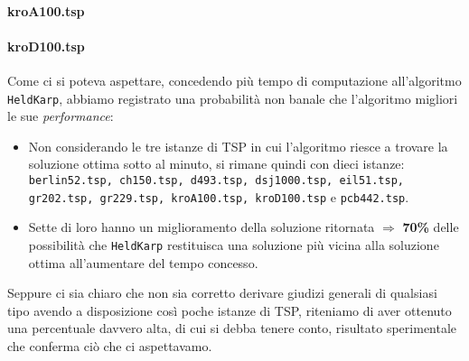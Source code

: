 \paragraph*{kroA100.tsp}
\paragraph*{kroD100.tsp}
\mbox{}\eqcapo

Come ci si poteva aspettare, concedendo più tempo di computazione all'algoritmo \texttt{HeldKarp}, abbiamo registrato una probabilità non banale che l'algoritmo migliori le sue \emph{performance}: 
\begin{itemize}
	\item Non considerando le tre istanze di TSP in cui l'algoritmo riesce a trovare la soluzione ottima sotto al minuto, si rimane quindi con dieci istanze: \texttt{berlin52.tsp, ch150.tsp, d493.tsp, dsj1000.tsp, eil51.tsp, gr202.tsp, gr229.tsp, kroA100.tsp, kroD100.tsp} e \texttt{pcb442.tsp}.
	\item Sette di loro hanno un miglioramento della soluzione ritornata $\Rightarrow$ \textbf{70\%} delle possibilità che \texttt{HeldKarp} restituisca una soluzione più vicina alla soluzione ottima all'aumentare del tempo concesso.
\end{itemize}
Seppure ci sia chiaro che non sia corretto derivare giudizi generali di qualsiasi tipo avendo a disposizione così poche istanze di TSP, riteniamo di aver ottenuto una percentuale davvero alta, di cui si debba tenere conto, risultato sperimentale che conferma ciò che ci aspettavamo.\acapo

